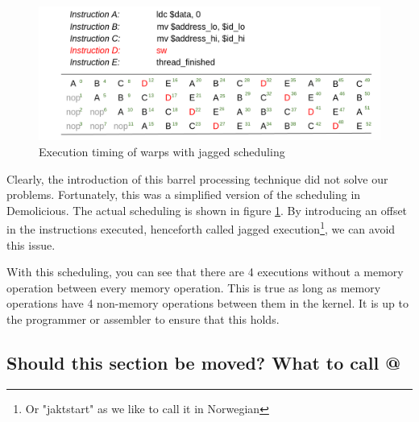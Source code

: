 \documentclass[../main/report.tex]{subfiles}
\begin{document}
\begin{figure}[htp]
\centering
\includegraphics[scale=0.25]{../gpu/diagrams/jaktstart_num.png}
\caption{Execution timing of warps with jagged scheduling}
\label{jagged}
\end{figure}

Clearly, the introduction of this barrel processing technique did not solve our problems.
Fortunately, this was a simplified version of the scheduling in Demolicious. 
The actual scheduling is shown in figure \ref{jagged}. 
By introducing an offset in the instructions executed, henceforth called jagged execution\footnote{Or "jaktstart" as we like to call it in Norwegian}, we can avoid this issue.

With this scheduling, you can see that there are 4 executions without a memory operation between every memory operation.
This is true as long as memory operations have 4 non-memory operations between them in the kernel.
It is up to the programmer or assembler to ensure that this holds.


\subsection{Should this section be moved? What to call @}
\end{document}
